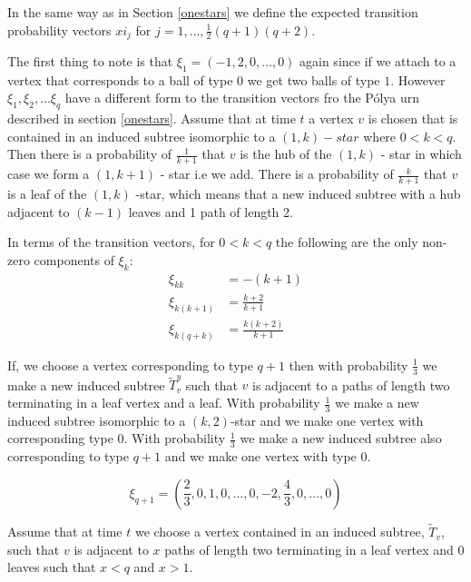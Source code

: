 \documentclass[12pt]{article} %
\theoremstyle{definition}
\begin{document}
In the same way as in Section \ref{onestars} we define the expected transition probability vectors $xi_{j}$ for $j = 1,\dots,\frac{1}{2}(q+1)(q+2)$.  

The first thing to note is that $\xi_{1} = (-1,2,0,\dots,0)$ again since if we attach to a vertex that corresponds to a ball of type 0 we get two balls of type $1$.  However $\xi_{1},\xi_{2},\dots \xi_{q}$ have a different form to the transition vectors fro the P\'{o}lya urn described in section \ref{onestars}.   Assume that at time $t$  a vertex $v$ is chosen that is contained in an induced subtree isomorphic to a $(1,k)-star$  where $0<k<q$.  Then there is a probability of $\frac{1}{k+1}$ that $v$ is the hub of the $(1,k)$ - star in which case we form a $(1,k+1)$ - star i.e we add.  There is a probability of $\frac{k}{k+1}$ that $v$ is a leaf of the $(1,k)$ -star, which means that a new induced subtree with a hub adjacent to $(k-1)$ leaves and 1 path of length 2.

In terms of the transition vectors, for $0<k<q$ the following are the only non-zero components of $\xi_{k}$:
\begin{align*}
\xi_{kk} &= -(k +1) \\ 
\xi_{k(k+1)} &= \frac{k+2}{k+1} \\
\xi_{k(q+k)} &= \frac{k(k+2)}{k+1} 
\end{align*} 

If, we choose a vertex corresponding  to type $q+1$  then with probability $\frac{1}{3}$ we make a new induced subtree $\tilde{T}_{v}^{y}$ such that $v$ is adjacent to a paths of length two terminating in a leaf vertex and a leaf.  With probability $\frac{1}{3}$ we make a new induced subtree isomorphic to a $(k,2)$-star and we make one vertex with corresponding type 0.  With probability $\frac{1}{3}$ we make a new induced subtree also corresponding to type $q+1$ and we make one vertex with type 0.  

\[\xi_{q+1} = \left(\frac{2}{3},0,1,0,\dots,0,-2,\frac{4}{3},0,\dots,0\right)\]

Assume that at time $t$ we choose a vertex contained in an induced subtree, $\tilde{T}_{v}$, such that $v$ is adjacent to $x$ paths of length two terminating in a leaf vertex and $0$ leaves such that $x<q$ and $x>1$.
\end{document}
